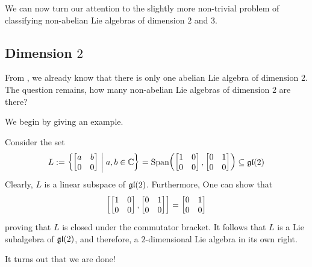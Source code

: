 We can now turn our attention to the slightly more non-trivial problem of classifying non-abelian Lie algebras of dimension $2$ and $3$.

\subsection{Dimension $2$}

From , we already know that there is only one abelian Lie algebra of dimension $2$. The question remains, how many non-abelian Lie algebras of dimension $2$ are there?

We begin by giving an example.

\begin{boxexample}
    Consider the set
    \begin{align*}
        L := \left\{ 
            \begin{bmatrix}
                a & b \\ 0 & 0
            \end{bmatrix}
         \; \middle\vert \; a, b \in \mathbb{C} \right\}
        = \operatorname{Span}\!\left( \begin{bmatrix} 1 & 0 \\ 0 & 0 \end{bmatrix}, \begin{bmatrix} 0 & 1 \\ 0 & 0 \end{bmatrix} \right)
        \subseteq \mathfrak{gl}\!\left( 2 \right)
    \end{align*}
    Clearly, $L$ is a linear subspace of $\mathfrak{gl}\!\left( 2 \right)$. Furthermore, One can show that
    \begin{align*}
        \left[ 
            \begin{bmatrix} 1 & 0 \\ 0 & 0 \end{bmatrix}, \begin{bmatrix} 0 & 1 \\ 0 & 0 \end{bmatrix}
         \right] = \begin{bmatrix} 0 & 1 \\ 0 & 0 \end{bmatrix}
    \end{align*}
    proving that $L$ is closed under the commutator bracket. It follows that $L$ is a Lie subalgebra of $\mathfrak{gl}\!\left( 2 \right)$, and therefore, a $2$-dimensional Lie algebra in its own right.
\end{boxexample}

It turns out that we are done!

